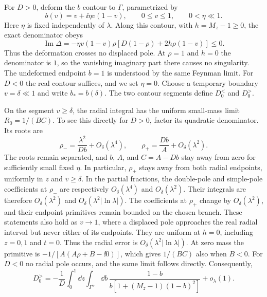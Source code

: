 For $D>0$, deform the $b$ contour to $\Gamma$, parametrized by
\begin{equation}
 b(v)=v+\ii\eta v(1-v),\qquad 0\leq v\leq1,
 \qquad 0<\eta\ll1.
\end{equation}
Here $\eta$ is fixed independently of $\lambda$. Along this contour,
with $h=M_z-1\geq0$, the exact denominator obeys
\begin{equation}
 \operatorname{Im}\Delta
 =-\eta v(1-v)\rho
       [D(1-\rho)+2h\rho(1-v)]\leq0.
\end{equation}
Thus the deformation crosses no displaced pole. At $\rho=1$ and
$h=0$ the denominator is $1$, so the vanishing imaginary part there
causes no singularity. The undeformed endpoint $b=1$ is understood
by the same Feynman limit. For $D<0$ the real contour suffices, and
we set $\eta=0$. Choose a temporary boundary $v=\delta\ll1$ and
write $b_*=b(\delta)$. The two contour segments define $D_0^{<}$
and $D_0^{>}$.

On the segment $v\geq\delta$, the radial integral has the uniform
small-mass limit $R_0=1/(BC)$. To see this directly for $D>0$,
factor its quadratic denominator. Its roots are
\begin{equation}
 \rho_-=\frac{\lambda^2}{Db}+O_\delta(\lambda^4),\qquad
 \rho_+=\frac{Db}{A}+O_\delta(\lambda^2).
\end{equation}
The roots remain separated, and $b$, $A$, and $C=A-Db$ stay away
from zero for sufficiently small fixed $\eta$. In particular,
$\rho_+$ stays away from both radial endpoints, uniformly in $z$
and $v\geq\delta$. In the partial fractions, the double-pole and
simple-pole coefficients at $\rho_-$ are respectively $O_\delta(\lambda^4)$
and $O_\delta(\lambda^2)$. Their integrals are therefore
$O_\delta(\lambda^2)$ and $O_\delta(\lambda^2|\ln\lambda|)$.
The coefficients at $\rho_+$ change by $O_\delta(\lambda^2)$, and
their endpoint primitives remain bounded on the chosen branch.
These statements also hold as $v\to1$, where a displaced pole approaches
the real radial interval but never either of its endpoints.
They are uniform at $h=0$, including $z=0,1$ and $t=0$.
Thus the radial error is $O_\delta(\lambda^2|\ln\lambda|)$.
At zero mass the primitive is
$-1/[A(A\rho+B-\ii0)]$, which gives $1/(BC)$ also when $B<0$.
For $D<0$ no radial pole occurs, and the same limit follows directly.
Consequently,
\begin{equation}
 D_0^{>}=-\frac1D\int_0^1\dd z\int_{\Gamma^{>}}\dd b\,
 \frac{1-b}{b[1+(M_z-1)(1-b)^2]}+o_\lambda(1).
\end{equation}

